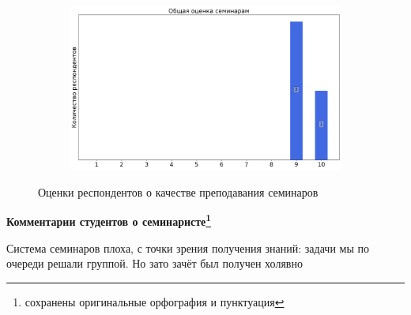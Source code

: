 \begin{figure}[H]
\begin{subfigure}[b]{0.45\textwidth}
                \end{subfigure}
                \begin{subfigure}[b]{0.45\textwidth}
                    \centering
                    \includegraphics[width=\textwidth]{images/3 course/Общая физика - квантовая физика/seminarists-marks-Инжечик Л.В.-3.png}
                \end{subfigure}	
                \caption{Оценки респондентов о качестве преподавания семинаров}
            \end{figure}

            \textbf{Комментарии студентов о семинаристе\protect\footnote{сохранены оригинальные орфография и пунктуация}}
                \begin{commentbox} 
                    Система семинаров плоха, с точки зрения получения знаний: задачи мы по очереди решали группой. Но зато зачёт был получен холявно 
                \end{commentbox}

            
